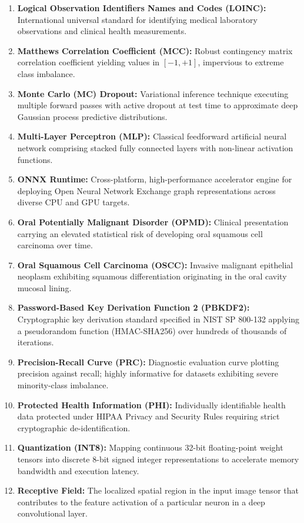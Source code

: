 \documentclass[12pt,a4paper,oneside]{report}
\begin{document}
\begin{enumerate}[label=\arabic*.]
    \item \textbf{Logical Observation Identifiers Names and Codes (LOINC):} International universal standard for identifying medical laboratory observations and clinical health measurements.
    \item \textbf{Matthews Correlation Coefficient (MCC):} Robust contingency matrix correlation coefficient yielding values in $[-1, +1]$, impervious to extreme class imbalance.
    \item \textbf{Monte Carlo (MC) Dropout:} Variational inference technique executing multiple forward passes with active dropout at test time to approximate deep Gaussian process predictive distributions.
    \item \textbf{Multi-Layer Perceptron (MLP):} Classical feedforward artificial neural network comprising stacked fully connected layers with non-linear activation functions.
    \item \textbf{ONNX Runtime:} Cross-platform, high-performance accelerator engine for deploying Open Neural Network Exchange graph representations across diverse CPU and GPU targets.
    \item \textbf{Oral Potentially Malignant Disorder (OPMD):} Clinical presentation carrying an elevated statistical risk of developing oral squamous cell carcinoma over time.
    \item \textbf{Oral Squamous Cell Carcinoma (OSCC):} Invasive malignant epithelial neoplasm exhibiting squamous differentiation originating in the oral cavity mucosal lining.
    \item \textbf{Password-Based Key Derivation Function 2 (PBKDF2):} Cryptographic key derivation standard specified in NIST SP 800-132 applying a pseudorandom function (HMAC-SHA256) over hundreds of thousands of iterations.
    \item \textbf{Precision-Recall Curve (PRC):} Diagnostic evaluation curve plotting precision against recall; highly informative for datasets exhibiting severe minority-class imbalance.
    \item \textbf{Protected Health Information (PHI):} Individually identifiable health data protected under HIPAA Privacy and Security Rules requiring strict cryptographic de-identification.
    \item \textbf{Quantization (INT8):} Mapping continuous 32-bit floating-point weight tensors into discrete 8-bit signed integer representations to accelerate memory bandwidth and execution latency.
    \item \textbf{Receptive Field:} The localized spatial region in the input image tensor that contributes to the feature activation of a particular neuron in a deep convolutional layer.

\end{enumerate}
\end{document}
